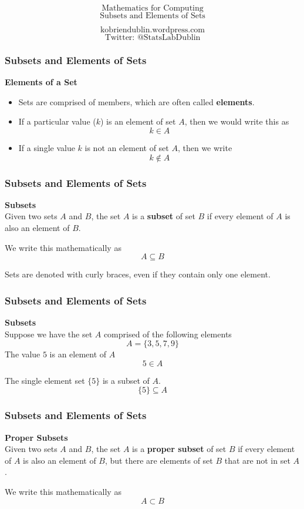 \documentclass{beamer}
\begin{document}
\begin{frame}
\Huge
\[ \mbox{Mathematics for Computing} \]
\huge
\[ \mbox{Subsets and Elements of Sets} \]

\Large
\[ \mbox{kobriendublin.wordpress.com} \]
\[ \mbox{Twitter: @StatsLabDublin} \]

\end{frame}
\begin{frame}
\frametitle{Subsets and Elements of Sets}
\Large
\vspace{-0.5cm}
\textbf{Elements of a Set}\\
\begin{itemize}
\item Sets are comprised of members, which are often called \textbf{elements}. 
\item If a particular value ($k$) is an element of set $A$, then we would write this as
\[k \in A \]

\item If a single value $k$ is not an element of set $A$, then we write
\[k \notin A \]
\end{itemize}
\end{frame}
\begin{frame}
\frametitle{Subsets and Elements of Sets}
\Large
\vspace{-1.5cm}
\textbf{Subsets}\\
Given two sets $A$ and $B$, the set $A$ is a \textbf{subset} of set $B$ if every element of $A$ is also an element of $B$. 


We write this mathematically as
\[A \subseteq B \]


\bigskip
Sets are denoted with curly braces, even if they contain only one element.

\end{frame}
\begin{frame}
\frametitle{Subsets and Elements of Sets}
\Large
\vspace{-0.4cm}
\textbf{Subsets}\\
Suppose we have the set $A$ comprised of the following elements
\[ A =\{3,5,7,9\}\]
The value $5$ is an element of $A$
\[  5 \in A \]

The single element set $\{5\} $ is a subset of $A$.
\[ \{5\} \subseteq A\]

\end{frame}
\begin{frame}
\frametitle{Subsets and Elements of Sets}
\Large
\vspace{-2cm}
\textbf{Proper Subsets}\\
Given two sets $A$ and $B$, the set $A$ is a \textbf{proper subset} of set $B$ if every element of $A$ is also an element of $B$, but there are elements of set $B$ that are not in set $A$.


We write this mathematically as
\[A \subset B \]

\end{frame}
\end{document}
